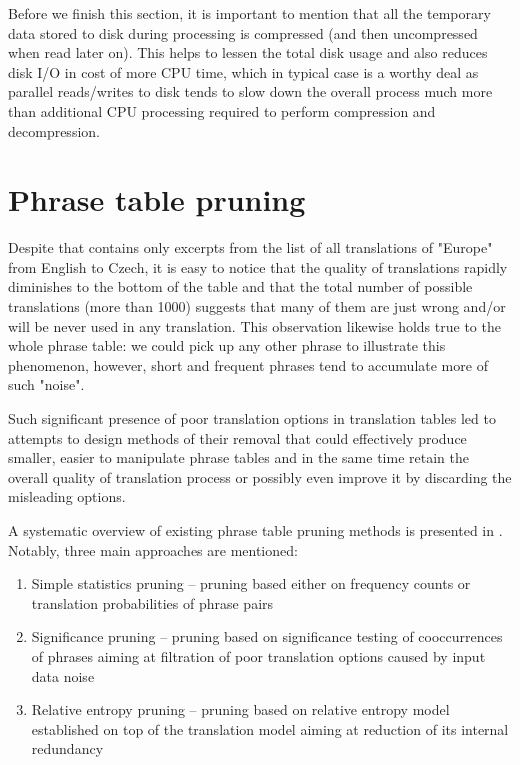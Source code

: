 Before we finish this section, it is important to mention that all
the temporary data stored to disk during processing is compressed
(and then uncompressed when read later on).
This helps to lessen the total disk usage and also reduces disk I/O in cost of
more CPU time, which in typical case is a worthy deal as parallel reads/writes
to disk tends to slow down the overall process much more than additional
CPU processing required to perform compression and decompression.

\section{Phrase table pruning}
\label{sec:phrase-table-pruning}

Despite that  contains only excerpts from the list
of all translations of "Europe" from English to Czech, it is easy to notice
that the quality of translations rapidly diminishes to the bottom of the table
and that the total number of possible translations (more than 1000) suggests
that many of them are just wrong and/or will be never used in any translation.
This observation likewise holds true to the whole phrase table: we could pick up
any other phrase to illustrate this phenomenon, however, short and frequent
phrases tend to accumulate more of such "noise".

Such significant presence of poor translation options in translation tables led to
attempts to design methods of their removal that could effectively produce smaller,
easier to manipulate phrase tables and in the same time retain the overall quality of
translation process or possibly even improve it by discarding the misleading options.

A systematic overview of existing phrase table pruning methods is presented in \citep{zens:systcomp}.
Notably, three main approaches are mentioned:
\begin{enumerate}
  \item Simple statistics pruning -- pruning based either on frequency counts or
    translation probabilities of phrase pairs
  \item Significance pruning -- pruning based on significance testing of
    cooccurrences of phrases aiming at filtration of poor translation options caused
    by input data noise
  \item Relative entropy pruning -- pruning based on relative entropy model established
    on top of the translation model aiming at reduction of its internal redundancy
\end{enumerate}

